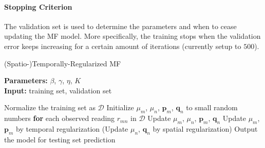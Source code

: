 \paragraph*{Stopping Criterion}
The validation set is used to determine the parameters and when to cease updating the MF model. More specifically, the training stops when the validation error keeps increasing for a certain amount of iterations (currently setup to $500$). 

\begin{algorithm}
	\caption{(Spatio-)Temporally-Regularized MF}
	\label{alg:STRMF}
	\textbf{Parameters:} $\beta$, $\gamma$, $\eta$, $K$\\
	\textbf{Input:} training set, validation set
	\begin{algorithmic}
		\State Normalize the training set as $\mathcal{D}$
		\State Initialize $\mu_m$, $\mu_n$, $\mathbf{p}_m$, $\mathbf{q}_n$ to small random numbers
		\Repeat
			\State \textbf{for} each observed reading $r_{mn}$ in $\mathcal{D}$
				\State \indent Update $\mu_m$, $\mu_n$, $\mathbf{p}_{m}$, $\mathbf{q}_{n}$
			\State Update $\mu_m$, $\mathbf{p}_m$ by temporal regularization
			\State (Update $\mu_n$, $\mathbf{q}_n$ by spatial regularization)
		\State Output the model for testing set prediction
	\end{algorithmic}
\end{algorithm}
